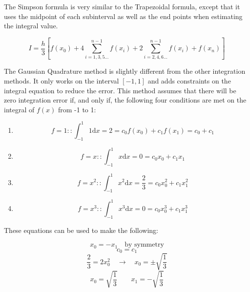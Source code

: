 \documentclass[12pt, letterpaper]{article}
\begin{document}
	 The Simpson formula is very similar to the Trapezoidal formula, except that it uses the midpoint of each subinterval as well as the end points when estimating the integral value.
	 
	 \begin{equation*} I = \frac{h}{3} \left[f(x_0)+4\!\!\!\sum_{i=1, 3, 5...}^{n-1}{\!\!\!f(x_i)}+2\!\!\!\sum_{i=2, 4, 6...}^{n-1}{\!\!\!f(x_i)}+f(x_n)\right] \end{equation*}
	 
	 The Gaussian Quadrature method is slightly different from the other integration methods. It only works on the interval $[-1, 1]$ and adds constraints on the integral equation to reduce the error. This method assumes that there will be zero integration error if, and only if, the following four conditions are met on the integral of $f(x)$ from -1 to 1:
	 
	 \begin{enumerate}
	 \item \begin{equation*}f=1::\int_{-1}^{1}{1\mathrm{d}x}=2=c_0f(x_0)+c_1f(x_1)=c_0+c_1\end{equation*}
	 \item \begin{equation*}f=x::\int_{-1}^{1}{x\mathrm{d}x}=0=c_0x_0+c_1x_1\end{equation*}
	 \item \begin{equation*}f=x^2::\int_{-1}^{1}{x^2\mathrm{d}x}=\frac{2}{3}=c_0x_0^2+c_1x_1^2\end{equation*}
	 \item \begin{equation*}f=x^3::\int_{-1}^{1}{x^3\mathrm{d}x}=0=c_0x_0^3+c_1x_1^3\end{equation*}
	 \end{enumerate}
	 
	 These equations can be used to make the following:
	 
	 \begin{equation*}x_0=-x_1\quad \text{by symmetry}\end{equation*}
	 \begin{equation*}c_0=c_1\end{equation*}
	 \begin{equation*}\frac{2}{3}=2x_0^2 \quad\rightarrow\quad x_0=\pm\sqrt{\frac{1}{3}}\end{equation*}
	 \begin{equation*}x_0=\sqrt{\frac{1}{3}}\quad\quad x_1=-\sqrt{\frac{1}{3}}\end{equation*}
	 
\end{document}
